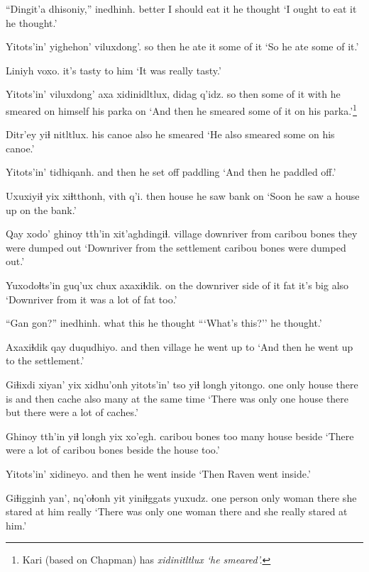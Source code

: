 \documentclass[12pt]{article}
\begin{document}
\gll ``Dingit'a dhisoniy,'' inedhinh.
better  {I should eat it} {he thought}
\glt `I ought to eat it  he thought.'
\glend

\gll Yitots'in' yighehon' viluxdong'.
{so then}  {he ate it} {some of it}
\glt `So he ate some of it.'
\glend

\gll Liniyh voxo.
{it's tasty} {to him}
\glt `It was really tasty.'
\glend

\gll Yitots'in' viluxdong' axa xidinidltlux,  didag  q'idz.
{so then}  {some of it} with {he smeared on himself}  {his parka} on
\glt `And then he smeared some of it on his parka.'\footnote{Kari (based on Chapman) has \em xidinitltlux \em `he smeared'.}
\glend

\gll Ditr'ey yiɬ nitltlux.
{his canoe} also {he smeared}
\glt `He also smeared some on his canoe.'
\glend

\gll Yitots'in' tidhiqanh.
{and then} {he set off paddling}
\glt `And then he paddled off.'
\glend

\gll Uxuxiyiɬ yix xiɬtthonh, vith q'i.
then  house {he saw}  bank on
\glt `Soon he saw a house up on the bank.'
\glend

\gll Qay  xodo'   ghinoy  tth'in  xit'aghdingiɬ.
village  {downriver from} caribou  bones  {they were dumped out}
\glt `Downriver from the settlement caribou bones were dumped out.'
\glend

\gll Yuxodoɬts'in   guq'ux chux axaxiɬdik.
{on the downriver side of it} fat  {it's big}  also
\glt `Downriver from it was a lot of fat too.'
\glend

\gll ``Gan gon?''  inedhinh.
what this  {he thought}
\glt ```What's this?'' he thought.'
\glend

\gll Axaxiɬdik qay  duqudhiyo.
{and then} village  {he went up to}
\glt `And then he went up to the settlement.'
\glend

\gll Giɬixdi xiyan' yix xidhu'onh yitots'in' tso yiɬ longh yitongo.
one  only  house {there is}  {and then} cache also many {at the same time}
\glt `There was only one house there but there were a lot of caches.'
\glend

\gll Ghinoy tth'in  yiɬ longh  yix xo'egh.
caribou  bones  too many  house beside
\glt `There were a lot of caribou bones beside the house too.'
\glend

\gll Yitots'in' xidineyo.
{and then} {he went inside}
\glt `Then Raven went inside.'
\glend

\gll Giɬigginh yan', nq'oɬonh yit yiniɬggats yuxudz.
{one person} only woman there {she stared at him} really
\glt `There was only one woman there and she really stared at him.'
\glend
\end{document}
